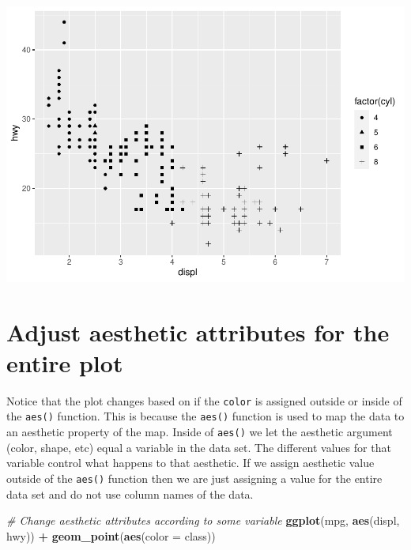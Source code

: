 \documentclass[
]{book}
\newenvironment{Shaded}{\begin{snugshade}}{\end{snugshade}}
\newcommand{\CommentTok}[1]{\textcolor[rgb]{0.56,0.35,0.01}{\textit{#1}}}
\newcommand{\DataTypeTok}[1]{\textcolor[rgb]{0.13,0.29,0.53}{#1}}
\newcommand{\KeywordTok}[1]{\textcolor[rgb]{0.13,0.29,0.53}{\textbf{#1}}}
\newcommand{\NormalTok}[1]{#1}
\newcommand{\OperatorTok}[1]{\textcolor[rgb]{0.81,0.36,0.00}{\textbf{#1}}}
\newcommand{\StringTok}[1]{\textcolor[rgb]{0.31,0.60,0.02}{#1}}
\begin{document}
\includegraphics{_main_files/figure-latex/unnamed-chunk-255-3.pdf}

\hypertarget{adjust-aesthetic-attributes-for-the-entire-plot}{%
\section{Adjust aesthetic attributes for the entire plot}\label{adjust-aesthetic-attributes-for-the-entire-plot}}

Notice that the plot changes based on if the \texttt{color} is assigned outside or inside of the \texttt{aes()} function. This is because the \texttt{aes()} function is used to map the data to an aesthetic property of the map. Inside of \texttt{aes()} we let the aesthetic argument (color, shape, etc) equal a variable in the data set. The different values for that variable control what happens to that aesthetic. If we assign aesthetic value outside of the \texttt{aes()} function then we are just assigning a value for the entire data set and do not use column names of the data.

\begin{Shaded}
\begin{Highlighting}[]
\CommentTok{# Change aesthetic attributes according to some variable}
\KeywordTok{ggplot}\NormalTok{(mpg, }\KeywordTok{aes}\NormalTok{(displ, hwy)) }\OperatorTok{+}\StringTok{ }\KeywordTok{geom_point}\NormalTok{(}\KeywordTok{aes}\NormalTok{(}\DataTypeTok{color =}\NormalTok{ class))}
\end{Highlighting}
\end{Shaded}
\end{document}
